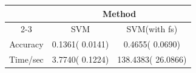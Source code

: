  
 


\begin{tabular}{ccc}\hline
  & \multicolumn{2}{c}{Method} \\ \cline{2-3} 
  & SVM & SVM(with fs) \\ \hline 
Accuracy &   0.1361(  0.0141) &   0.4655(  0.0690) \\ \hline
Time/sec & 3.7740(  0.1224) &   138.4383(  26.0866) \\ \hline
\end{tabular}
